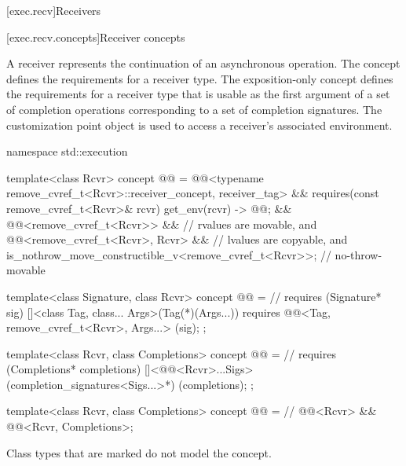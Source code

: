 [exec.recv]{Receivers}

[exec.recv.concepts]{Receiver concepts}

\pnum
A receiver represents the continuation of an asynchronous operation.
The  concept defines
the requirements for a receiver type.
The exposition-only concept  defines
the requirements for a receiver type that is usable as
the first argument of a set of completion operations
corresponding to a set of completion signatures.
The  customization point object is used to access
a receiver's associated environment.
\begin{codeblock}
namespace std::execution {
  template<class Rcvr>
    concept @@ =
      @@<typename remove_cvref_t<Rcvr>::receiver_concept, receiver_tag> &&
      requires(const remove_cvref_t<Rcvr>& rcvr) {
        { get_env(rcvr) } -> @@;
      } &&
      @@<remove_cvref_t<Rcvr>> &&               // rvalues are movable, and
      @@<remove_cvref_t<Rcvr>, Rcvr> &&         // lvalues are copyable, and
      is_nothrow_move_constructible_v<remove_cvref_t<Rcvr>>;    // no-throw-movable

  template<class Signature, class Rcvr>
    concept @@ =                              // \expos
      requires (Signature* sig) {
        []<class Tag, class... Args>(Tag(*)(Args...))
            requires @@<Tag, remove_cvref_t<Rcvr>, Args...>
        {}(sig);
      };

  template<class Rcvr, class Completions>
    concept @@ =                                   // \expos
      requires (Completions* completions) {
        []<@@<Rcvr>...Sigs>(completion_signatures<Sigs...>*)
        {}(completions);
      };

  template<class Rcvr, class Completions>
    concept @@ =                                       // \expos
      @@<Rcvr> && @@<Rcvr, Completions>;
}
\end{codeblock}

\pnum
Class types that are marked  do not model the  concept.

